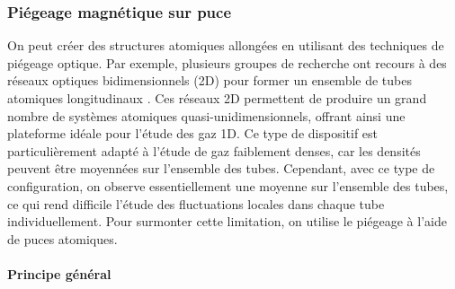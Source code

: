 \subsubsection{Piégeage magnétique sur puce}
\label{sec:piegeage_puce}

On peut créer des structures atomiques allongées en utilisant des techniques de piégeage optique. Par exemple, plusieurs groupes de recherche ont recours à des réseaux optiques bidimensionnels (2D) pour former un ensemble de tubes atomiques longitudinaux \cite{Kinoshita2004,LaburtheTolra2004,Paredes2004,Moritz2003}. Ces réseaux 2D permettent de produire un grand nombre de systèmes atomiques quasi-unidimensionnels, offrant ainsi une plateforme idéale pour l’étude des gaz 1D. Ce type de dispositif est particulièrement adapté à l’étude de gaz faiblement denses, car les densités peuvent être moyennées sur l’ensemble des tubes. Cependant, avec ce type de configuration, on observe essentiellement une moyenne sur l’ensemble des tubes, ce qui rend difficile l’étude des fluctuations locales dans chaque tube individuellement. Pour surmonter cette limitation, on utilise le piégeage à l’aide de puces atomiques.

\paragraph{Principe général}




